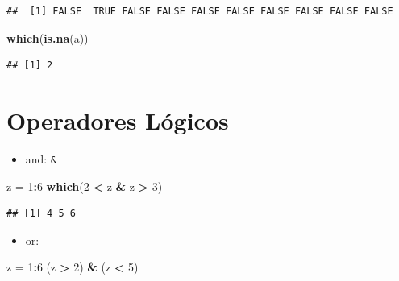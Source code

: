 \documentclass[]{book}
\newenvironment{Shaded}{\begin{snugshade}}{\end{snugshade}}
\newcommand{\KeywordTok}[1]{\textcolor[rgb]{0.13,0.29,0.53}{\textbf{#1}}}
\newcommand{\DecValTok}[1]{\textcolor[rgb]{0.00,0.00,0.81}{#1}}
\newcommand{\StringTok}[1]{\textcolor[rgb]{0.31,0.60,0.02}{#1}}
\newcommand{\OperatorTok}[1]{\textcolor[rgb]{0.81,0.36,0.00}{\textbf{#1}}}
\newcommand{\NormalTok}[1]{#1}
\providecommand{\tightlist}{%
  \setlength{\itemsep}{0pt}\setlength{\parskip}{0pt}}
\begin{document}
\begin{verbatim}
##  [1] FALSE  TRUE FALSE FALSE FALSE FALSE FALSE FALSE FALSE FALSE
\end{verbatim}

\begin{Shaded}
\begin{Highlighting}[]
\KeywordTok{which}\NormalTok{(}\KeywordTok{is.na}\NormalTok{(a))}
\end{Highlighting}
\end{Shaded}

\begin{verbatim}
## [1] 2
\end{verbatim}

\section{Operadores Lógicos}\label{operadores-logicos}

\begin{itemize}
\tightlist
\item
  and: \texttt{\&}
\end{itemize}

\begin{Shaded}
\begin{Highlighting}[]
\NormalTok{z =}\StringTok{ }\DecValTok{1}\OperatorTok{:}\DecValTok{6}
\KeywordTok{which}\NormalTok{(}\DecValTok{2} \OperatorTok{<}\StringTok{ }\NormalTok{z }\OperatorTok{&}\StringTok{ }\NormalTok{z }\OperatorTok{>}\StringTok{ }\DecValTok{3}\NormalTok{)}
\end{Highlighting}
\end{Shaded}

\begin{verbatim}
## [1] 4 5 6
\end{verbatim}

\begin{itemize}
\tightlist
\item
  or: \texttt{\textbar{}}
\end{itemize}

\begin{Shaded}
\begin{Highlighting}[]
\NormalTok{z =}\StringTok{ }\DecValTok{1}\OperatorTok{:}\DecValTok{6}
\NormalTok{(z }\OperatorTok{>}\StringTok{ }\DecValTok{2}\NormalTok{) }\OperatorTok{&}\StringTok{ }\NormalTok{(z }\OperatorTok{<}\StringTok{ }\DecValTok{5}\NormalTok{)}
\end{Highlighting}
\end{Shaded}
\end{document}
